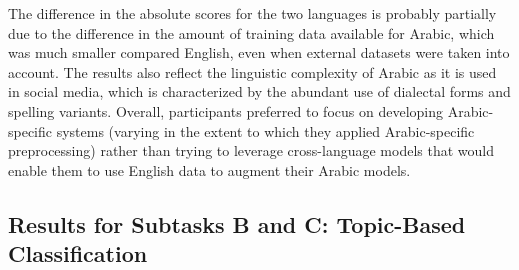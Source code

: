 \documentclass[11pt,a4paper]{article}
\begin{document}
\noindent The difference in the absolute scores for the two languages is probably partially due to the difference in the amount of training data available for Arabic, which was much smaller compared English, even when external datasets were taken into account. 
The results also reflect the linguistic complexity of Arabic as it is used in social media, which is characterized by the abundant use of dialectal forms and spelling variants. Overall, participants preferred to focus on developing Arabic-specific systems (varying in the extent to which they applied Arabic-specific preprocessing) rather than trying to leverage cross-language models that would enable them to use English data to augment their Arabic models.






\subsection{Results for Subtasks B and C: Topic-Based Classification}
\end{document}
